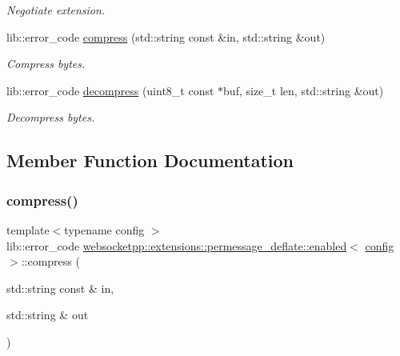 \begin{DoxyCompactItemize}
\begin{DoxyCompactList}\small\item\em Negotiate extension. \end{DoxyCompactList}\item 
lib\+::error\+\_\+code \mbox{\hyperlink{classwebsocketpp_1_1extensions_1_1permessage__deflate_1_1enabled_a3002ea83fbc0066f9ecf23b4be082365}{compress}} (std\+::string const \&in, std\+::string \&out)
\begin{DoxyCompactList}\small\item\em Compress bytes. \end{DoxyCompactList}\item 
lib\+::error\+\_\+code \mbox{\hyperlink{classwebsocketpp_1_1extensions_1_1permessage__deflate_1_1enabled_a55efd7772443eaf07435042a146cc5f7}{decompress}} (uint8\+\_\+t const $\ast$buf, size\+\_\+t len, std\+::string \&out)
\begin{DoxyCompactList}\small\item\em Decompress bytes. \end{DoxyCompactList}\end{DoxyCompactItemize}


\subsection{Member Function Documentation}
\mbox{\label{classwebsocketpp_1_1extensions_1_1permessage__deflate_1_1enabled_a3002ea83fbc0066f9ecf23b4be082365}} 
\subsubsection{\texorpdfstring{compress()}{compress()}}
{\footnotesize\ttfamily template$<$typename config $>$ \\
lib\+::error\+\_\+code \mbox{\hyperlink{classwebsocketpp_1_1extensions_1_1permessage__deflate_1_1enabled}{websocketpp\+::extensions\+::permessage\+\_\+deflate\+::enabled}}$<$ \mbox{\hyperlink{classconfig}{config}} $>$\+::compress (\begin{DoxyParamCaption}\item[{std\+::string const \&}]{in,  }\item[{std\+::string \&}]{out }\end{DoxyParamCaption})\hspace{0.3cm}{\ttfamily [inline]}}




